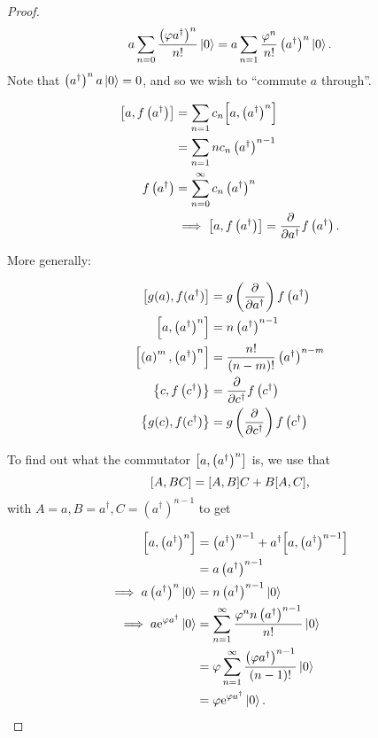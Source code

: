 \begin{proof}
\label{unc:proof}
\begin{equation*}
a\sum_{n=0}\frac{\left(\varphi a^\dagger\right)^n}{n!}\ket{0} = a\sum_{n=1} \frac{\varphi^n}{n!}\left(a^\dagger\right)^n\ket{0}.
\end{equation*}
Note that $\left(a^\dagger\right)^na\ket{0} = 0$, and so we wish to ``commute $a$ through''.

\begin{align*}
\comm{a}{f\left(a^\dagger\right)} &= \sum_{n=1}c_n\comm{a}{\left(a^\dagger\right)^n} \\
&= \sum_{n=1}nc_n\left(a^\dagger\right)^{n-1}\\
f\left(a^\dagger\right) &= \sum_{n=0}^\infty c_n\left(a^\dagger\right)^n \\
&\implies \comm{a}{f\left(a^\dagger\right)} = \pdv{a^\dagger}f\left(a^\dagger\right).
\end{align*}

More generally:

\begin{align*}
\comm{g(a)}{f(a^\dagger)} &= g\left(\pdv{a^\dagger}\right)f\left(a^\dagger\right)\\
\comm{a}{\left(a^\dagger\right)^n} &= n\left(a^\dagger\right)^{n-1} \\
\comm{\left(a\right)^m}{\left(a^\dagger\right)^n} &= \frac{n!}{(n-m)!}\left(a^\dagger\right)^{n-m} \\
\acomm{c}{f\left(c^\dagger\right)} &= \pdv{c^\dagger}f\left(c^\dagger\right) \\
\acomm{g(c)}{f(c^\dagger)} &= g\left(\pdv{c^\dagger}\right)f\left(c^\dagger\right)
\end{align*}

To find out what the commutator $\comm{a}{\left(a^\dagger\right)^n}$ is, we use that 
\begin{equation}
\comm{A}{BC} = \comm{A}{B}C + B\comm{A}{C}, 
\end{equation}
with $A =a, B = a^\dagger, C = \left(a^\dagger\right)^{n-1}$ to get

\begin{align*}
\comm{a}{\left(a^\dagger\right)^n} &= \left(a^\dagger\right)^{n-1} + a^\dagger\comm{a}{\left(a^\dagger\right)^{n-1}} \\
&= a\left(a^\dagger\right)^{n-1} \\
\implies a\left(a^\dagger\right)^{n}\ket{0} &= n\left(a^\dagger\right)^{n-1}\ket{0}\\
\implies a\e^{\varphi a^\dagger}\ket{0} &= \sum_{n=1}^\infty\frac{\varphi^nn\left(a^\dagger\right)^{n-1}}{n!}\ket{0} \\
&= \varphi\sum_{n=1}^\infty\frac{\left(\varphi a^\dagger\right)^{n-1}}{(n-1)!}\ket{0}\\ &= \varphi\e^{\varphi a^\dagger}\ket{0}.
\end{align*}
\end{proof}

